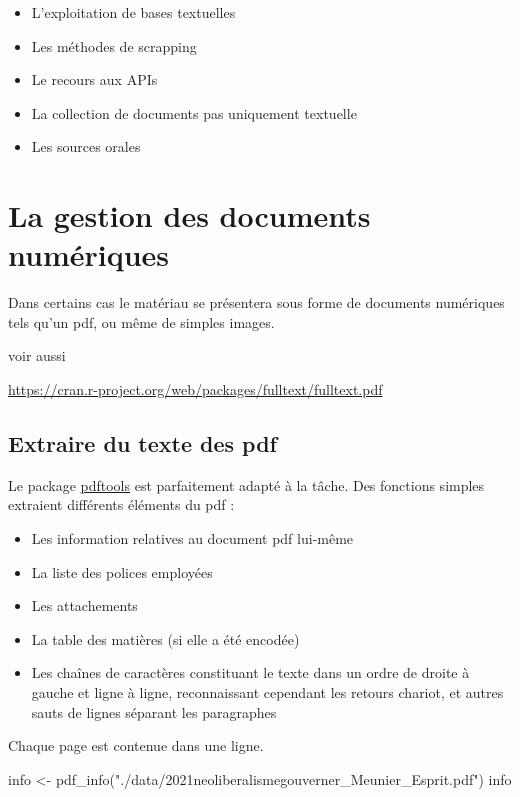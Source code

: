 \documentclass[
  letterpaper,
  DIV=11,
  numbers=noendperiod]{scrreprt}
\newenvironment{Shaded}{\begin{snugshade}}{\end{snugshade}}
\newcommand{\FunctionTok}[1]{\textcolor[rgb]{0.28,0.35,0.67}{#1}}
\newcommand{\NormalTok}[1]{\textcolor[rgb]{0.00,0.23,0.31}{#1}}
\newcommand{\OtherTok}[1]{\textcolor[rgb]{0.00,0.23,0.31}{#1}}
\newcommand{\StringTok}[1]{\textcolor[rgb]{0.13,0.47,0.30}{#1}}
\providecommand{\tightlist}{%
  \setlength{\itemsep}{0pt}\setlength{\parskip}{0pt}}\usepackage{longtable,booktabs,array}
\begin{document}
\begin{itemize}
\tightlist
\item
  L'exploitation de bases textuelles
\item
  Les méthodes de scrapping
\item
  Le recours aux APIs
\item
  La collection de documents pas uniquement textuelle
\item
  Les sources orales
\end{itemize}

\section{La gestion des documents
numériques}\label{la-gestion-des-documents-numuxe9riques}

Dans certains cas le matériau se présentera sous forme de documents
numériques tels qu'un pdf, ou même de simples images.

voir aussi

\url{https://cran.r-project.org/web/packages/fulltext/fulltext.pdf}

\subsection{Extraire du texte des pdf}\label{extraire-du-texte-des-pdf}

Le package
\href{https://ropensci.org/blog/2016/03/01/pdftools-and-jeroen/}{pdftools}
est parfaitement adapté à la tâche. Des fonctions simples extraient
différents éléments du pdf :

\begin{itemize}
\item
  Les information relatives au document pdf lui-même
\item
  La liste des polices employées
\item
  Les attachements
\item
  La table des matières (si elle a été encodée)
\item
  Les chaînes de caractères constituant le texte dans un ordre de droite
  à gauche et ligne à ligne, reconnaissant cependant les retours
  chariot, et autres sauts de lignes séparant les paragraphes
\end{itemize}

Chaque page est contenue dans une ligne.

\begin{Shaded}
\begin{Highlighting}[]
\NormalTok{info }\OtherTok{\textless{}{-}} \FunctionTok{pdf\_info}\NormalTok{(}\StringTok{"./data/2021neoliberalismegouverner\_Meunier\_Esprit.pdf"}\NormalTok{)}
\NormalTok{info}
\end{Highlighting}
\end{Shaded}
\end{document}
